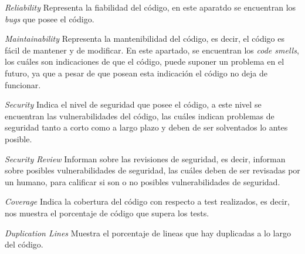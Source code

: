 \begin{list}{\textbullet}{ %
    \addtolength{\itemsep}{-2mm} %
    \setlength{\itemindent}{2mm}}

    \item \textit{Reliability} Representa la fiabilidad del código, en este aparatdo se encuentran los \textit{bugs} que posee el código.
    \item \textit{Maintainability} Representa la mantenibilidad del código, es decir, el código es fácil de mantener y de modificar. En este apartado, se encuentran los \textit{code smells}, los cuáles son indicaciones de que el código, puede suponer un problema en el futuro, ya que a pesar de que posean esta indicación el código no deja de funcionar.
    \item \textit{Security} Indica el nivel de seguridad que posee el código, a este nivel se encuentran las vulnerabilidades del código, las cuáles indican problemas de seguridad tanto a corto como a largo plazo y deben de ser solventados lo antes posible.
    \item \textit{Security Review} Informan sobre las revisiones de seguridad, es decir, informan sobre posibles vulnerabilidades de seguridad, las cuáles deben de ser revisadas por un humano, para calificar si son o no posibles vulnerabilidades de seguridad.
    \item \textit{Coverage} Indica la cobertura del código con respecto a test realizados, es decir, nos muestra el porcentaje de código que supera los tests.
    \item \textit{Duplication Lines} Muestra el porcentaje de lineas que hay duplicadas a lo largo del código.
\end{list}